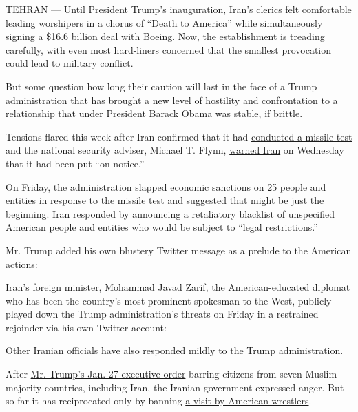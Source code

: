 TEHRAN --- Until President Trump's inauguration, Iran's clerics felt
comfortable leading worshipers in a chorus of ``Death to America'' while
simultaneously signing
\href{https://www.nytimes3xbfgragh.onion/2016/12/11/world/middleeast/iran-boeing-airplane-deal.html}{a
\$16.6 billion deal} with Boeing. Now, the establishment is treading
carefully, with even most hard-liners concerned that the smallest
provocation could lead to military conflict.

But some question how long their caution will last in the face of a
Trump administration that has brought a new level of hostility and
confrontation to a relationship that under President Barack Obama was
stable, if brittle.

Tensions flared this week after Iran confirmed that it had
\href{https://www.nytimes3xbfgragh.onion/2017/01/30/world/middleeast/iran-missile-test.html?_r=0}{conducted
a missile test} and the national security adviser, Michael T. Flynn,
\href{https://www.nytimes3xbfgragh.onion/2017/02/01/world/middleeast/iran-missile-test.html}{warned
Iran} on Wednesday that it had been put ``on notice.''

On Friday, the administration
\href{https://www.nytimes3xbfgragh.onion/2017/02/03/us/politics/iran-sanctions-trump.html}{slapped
economic sanctions on 25 people and entities} in response to the missile
test and suggested that might be just the beginning. Iran responded by
announcing a retaliatory blacklist of unspecified American people and
entities who would be subject to ``legal restrictions.''

Mr. Trump added his own blustery Twitter message as a prelude to the
American actions:

Iran's foreign minister, Mohammad Javad Zarif, the American-educated
diplomat who has been the country's most prominent spokesman to the
West, publicly played down the Trump administration's threats on Friday
in a restrained rejoinder via his own Twitter account:

Other Iranian officials have also responded mildly to the Trump
administration.

After
\href{https://www.nytimes3xbfgragh.onion/2017/01/27/us/politics/refugee-muslim-executive-order-trump.html}{Mr.
Trump's Jan. 27 executive order} barring citizens from seven
Muslim-majority countries, including Iran, the Iranian government
expressed anger. But so far it has reciprocated only by banning
\href{https://www.nytimes3xbfgragh.onion/2017/02/03/sports/iran-american-wrestling-team-world-cup.html}{a
visit by American wrestlers}.

